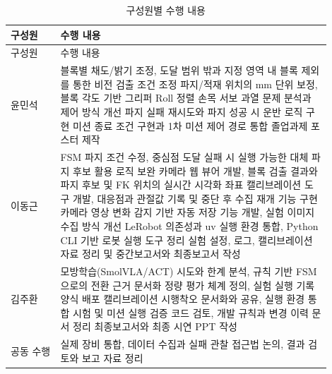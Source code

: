 \begin{longtable}{@{}L{0.14\linewidth}L{0.76\linewidth}@{}}
\caption{구성원별 수행 내용}\label{tab:roles}\\
\toprule 구성원 & 수행 내용 \\\midrule
\endfirsthead
\toprule 구성원 & 수행 내용 \\\midrule
\endhead
윤민석 & 블록별 채도/밝기 조정, 도달 범위 밖과 지정 영역 내 블록 제외를 통한 비전 검출 조건 조정\newline
파지/적재 위치의 mm 단위 보정, 블록 각도 기반 그리퍼 Roll 정렬\newline
손목 서보 과열 문제 분석과 제어 방식 개선\newline
파지 실패 재시도와 파지 성공 시 운반 로직 구현\newline
미션 종료 조건 구현과 1차 미션 제어 경로 통합\newline
졸업과제 포스터 제작 \\
이동근 & FSM 파지 조건 수정, 중심점 도달 실패 시 실행 가능한 대체 파지 후보 활용 로직 보완\newline
카메라 웹 뷰어 개발, 블록 검출 결과와 파지 후보 및 FK 위치의 실시간 시각화\newline
좌표 캘리브레이션 도구 개발, 대응점과 관절값 기록 및 중단 후 수집 재개 기능 구현\newline
카메라 영상 변화 감지 기반 자동 저장 기능 개발, 실험 이미지 수집 방식 개선\newline
LeRobot 의존성과 uv 실행 환경 통합, Python CLI 기반 로봇 실행 도구 정리\newline
실험 설정, 로그, 캘리브레이션 자료 정리 및 중간보고서와 최종보고서 작성 \\
김주환 & 모방학습(SmolVLA/ACT) 시도와 한계 분석, 규칙 기반 FSM으로의 전환 근거 문서화\newline
정량 평가 체계 정의, 실험 실행 기록 양식 배포\newline
캘리브레이션 시행착오 문서화와 공유, 실행 환경 통합 시험 및 미션 실행 검증\newline
코드 검토, 개발 규칙과 변경 이력 문서 정리\newline
최종보고서와 최종 시연 PPT 작성 \\
공동 수행 & 실제 장비 통합, 데이터 수집과 실패 관찰\newline
접근법 논의, 결과 검토와 보고 자료 정리 \\
\bottomrule
\end{longtable}
\FloatBarrier
